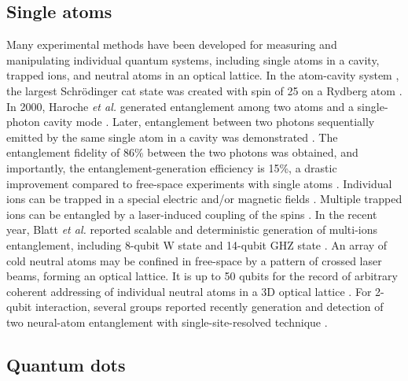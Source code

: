 %
%

\subsection{Single atoms} 

Many experimental methods have been developed for measuring and manipulating individual quantum systems, including single atoms in a cavity, trapped ions, and neutral atoms in an optical lattice. In the atom-cavity system \cite{bib:haroche2006exploring}, the largest Schr{\"o}dinger cat state was created with spin of 25 on a Rydberg atom \cite{bib:facon2016sensitive}. In 2000, Haroche \textit{et al.} generated entanglement among two atoms and a single-photon cavity mode \cite{bib:rauschenbeutel2000step}. Later, entanglement between two photons sequentially emitted by the same single atom in a cavity was demonstrated \cite{bib:wilk2007single}. The entanglement fidelity of 86\% between the two photons was obtained, and importantly, the entanglement-generation efficiency is 15\%, a drastic improvement compared to free-space experiments with single atoms \cite{bib:blinov2004observation}. Individual ions can be trapped in a special electric and/or magnetic fields \cite{bib:leibfried2003quantum}. Multiple trapped ions can be entangled by a laser-induced coupling of the spins \cite{bib:blatt2008entangled}. In the recent year, Blatt \textit{et al.} reported scalable and deterministic generation of multi-ions entanglement, including 8-qubit W state \cite{bib:haffner2005scalable} and 14-qubit GHZ state \cite{bib:monz2011}. An array of cold neutral atoms may be confined in free-space by a pattern of crossed laser beams, forming an optical lattice. It is up to 50 qubits for the record of arbitrary coherent addressing of individual neutral atoms in a 3D optical lattice \cite{bib:wang2015coherent}. For 2-qubit interaction, several groups reported recently generation and detection of two neural-atom entanglement with single-site-resolved technique \cite{bib:kaufman2015entangling, islam2015measuring, dai2016generation}.

%
%

\subsection{Quantum dots} 

